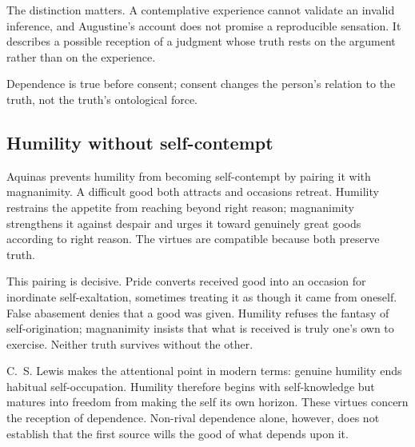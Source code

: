 The distinction matters. A contemplative experience cannot validate an invalid inference, and Augustine's account does not promise a reproducible sensation. It describes a possible reception of a judgment whose truth rests on the argument rather than on the experience.

Dependence is true before consent; consent changes the person's relation to the truth, not the truth's ontological force.

\subsection{Humility without self-contempt}

Aquinas prevents humility from becoming self-contempt by pairing it with magnanimity. A difficult good both attracts and occasions retreat. Humility restrains the appetite from reaching beyond right reason; magnanimity strengthens it against despair and urges it toward genuinely great goods according to right reason. The virtues are compatible because both preserve truth.

This pairing is decisive. Pride converts received good into an occasion for inordinate self-exaltation, sometimes treating it as though it came from oneself. False abasement denies that a good was given. Humility refuses the fantasy of self-origination; magnanimity insists that what is received is truly one's own to exercise. Neither truth survives without the other.

C.~S. Lewis makes the attentional point in modern terms: genuine humility ends habitual self-occupation. Humility therefore begins with self-knowledge but matures into freedom from making the self its own horizon. These virtues concern the reception of dependence. Non-rival dependence alone, however, does not establish that the first source wills the good of what depends upon it.
